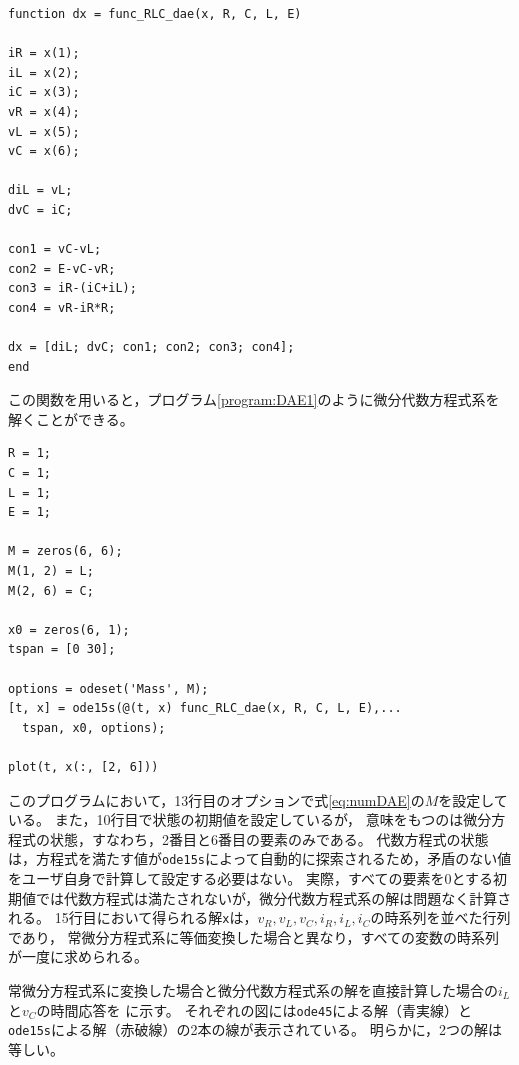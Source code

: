 \documentclass[tombow,dvipdfmx]{corona-a5-1.1}
\begin{document}
\begin{例}[簡単な微分代数方程式系の数値解法]
\smallskip
\begin{PROGRAMA}[count,title={func\_RLC\_dae.m}]\label{program:func_DAE1}
\begin{verbatim}
function dx = func_RLC_dae(x, R, C, L, E)

iR = x(1);
iL = x(2);
iC = x(3);
vR = x(4);
vL = x(5);
vC = x(6);

diL = vL;
dvC = iC;

con1 = vC-vL;
con2 = E-vC-vR;
con3 = iR-(iC+iL);
con4 = vR-iR*R;

dx = [diL; dvC; con1; con2; con3; con4];
end
\end{verbatim}
\end{PROGRAMA}

この関数を用いると，プログラム\nobreak\ref{program:DAE1}のように微分代数方程式系を解くことができる。

\smallskip
\begin{PROGRAMA}[count,title={main\_RLC\_dae.m}]\label{program:DAE1}
\begin{verbatim}
R = 1;
C = 1;
L = 1;
E = 1;

M = zeros(6, 6);
M(1, 2) = L;
M(2, 6) = C;

x0 = zeros(6, 1);
tspan = [0 30];

options = odeset('Mass', M);
[t, x] = ode15s(@(t, x) func_RLC_dae(x, R, C, L, E),...
  tspan, x0, options);

plot(t, x(:, [2, 6]))
\end{verbatim}
\end{PROGRAMA}


このプログラムにおいて，13行目のオプションで式\ref{eq:numDAE}の$M$を設定している。
また，10行目で状態の初期値を設定しているが，
意味をもつのは微分方程式の状態，すなわち，2番目と6番目の要素のみである。
代数方程式の状態は，方程式を満たす値が\verb|ode15s|によって自動的に探索されるため，矛盾のない値をユーザ自身で計算して設定する必要はない。
実際，すべての要素を$0$とする初期値では代数方程式は満たされないが，微分代数方程式系の解は問題なく計算される。
15行目において得られる解\verb|x|は，$v_R, v_L, v_C, i_R, i_L, i_C$の時系列を並べた行列であり，
常微分方程式系に等価変換した場合と異なり，すべての変数の時系列が一度に求められる。

常微分方程式系に変換した場合と微分代数方程式系の解を直接計算した場合の$i_L$と$v_C$の時間応答を
に示す。
それぞれの図には\verb|ode45|による解（青実線）と\verb|ode15s|による解（赤破線）の2本の線が表示されている。
明らかに，2つの解は等しい。



\end{例}
\end{document}
